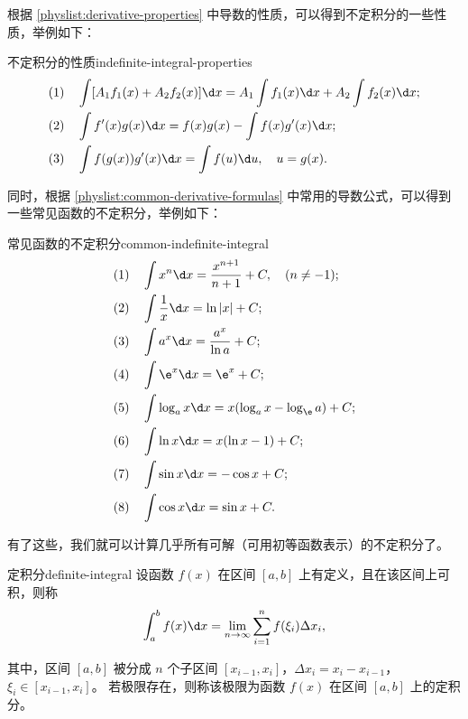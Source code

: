 根据 \cref{physlist:derivative-properties} 中导数的性质，可以得到不定积分的一些性质，举例如下：
\begin{physlist}{不定积分的性质}{indefinite-integral-properties}
    \begin{align}
         & (1)\quad \int [A_1 f_1(x) + A_2 f_2(x)] \d x = A_1 \int f_1(x) \d x + A_2 \int f_2(x) \d x ; \\
         & (2)\quad \int f'(x) g(x) \d x = f(x) g(x) - \int f(x) g'(x) \d x ;                           \\
         & (3)\quad \int f(g(x)) g'(x) \d x = \int f(u) \d u,\quad u = g(x) .
    \end{align}

\end{physlist}

同时，根据 \cref{physlist:common-derivative-formulas} 中常用的导数公式，可以得到一些常见函数的不定积分，举例如下：
\begin{physlist}{常见函数的不定积分}{common-indefinite-integral}
    \begin{align}
         & (1)\quad \int x^n \d x = \frac{x^{n+1}}{n+1} + C,\quad (n \neq -1) ; \\
         & (2)\quad \int \frac{1}{x} \d x = \ln |x| + C ;                       \\
         & (3)\quad \int a^x \d x = \frac{a^x}{\ln a} + C ;                     \\
         & (4)\quad \int \e^x \d x = \e^x + C ;                                 \\
         & (5)\quad \int \log_a x \d x = x (\log_a x - \log_{\e} a) + C ;       \\
         & (6)\quad \int \ln x \d x = x (\ln x - 1) + C ;                       \\
         & (7)\quad \int \sin x \d x = -\cos x + C ;                            \\
         & (8)\quad \int \cos x \d x = \sin x + C .
    \end{align}

\end{physlist}

有了这些，我们就可以计算几乎所有可解（可用初等函数表示）的不定积分了。

\bigskip

\begin{definition}{定积分}{definite-integral}
    设函数 $ f(x) $ 在区间 $ [a, b] $ 上有定义，且在该区间上可积，则称
    \begin{equation}
        \int_a^b f(x) \d x = \lim_{n \to \infty} \sum_{i=1}^n f(\xi_i) \Delta x_i,
    \end{equation}

    其中，区间 $ [a, b] $ 被分成 $ n $ 个子区间 $ [x_{i-1}, x_i] $，$ \Delta x_i = x_i - x_{i-1} $，$ \xi_i \in [x_{i-1}, x_i] $。
    若极限存在，则称该极限为函数 $ f(x) $ 在区间 $ [a, b] $ 上的定积分。

\end{definition}

